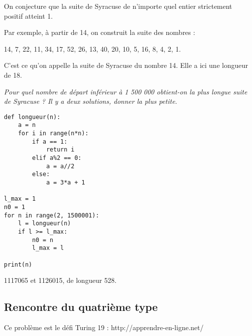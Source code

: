 On conjecture que la suite de Syracuse de n'importe quel entier strictement positif atteint 1.

Par exemple, à partir de 14, on construit la suite des nombres : 

14, 7, 22, 11, 34, 17, 52, 26, 13, 40, 20, 10, 5, 16, 8, 4, 2, 1. 

C'est ce qu'on appelle la suite de Syracuse du nombre 14. Elle a ici une longueur de 18.
\begin{Exercise}
\it Pour quel nombre de départ inférieur à 1 500 000 obtient-on la plus longue suite de Syracuse ? Il y a deux solutions, donner la plus petite.
\end{Exercise}
\begin{Answer}
\begin{lstlisting}
def longueur(n):
    a = n
    for i in range(n*n):
        if a == 1:
            return i
        elif a%2 == 0:
            a = a//2
        else:
            a = 3*a + 1
        
l_max = 1
n0 = 1
for n in range(2, 1500001):
    l = longueur(n)
    if l >= l_max:
        n0 = n
        l_max = l

print(n)
\end{lstlisting}
1117065 et 1126015, de longueur 528.
\end{Answer}
\subsection{Rencontre du quatrième type}
{\sf Ce problème est le défi Turing 19 : http://apprendre-en-ligne.net/}

